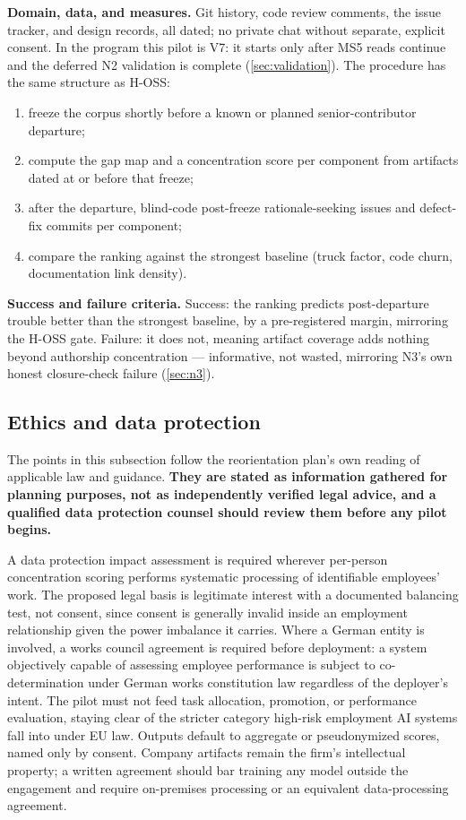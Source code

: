 \textbf{Domain, data, and measures.} Git history, code review comments, the issue tracker, and
design records, all dated; no private chat without separate, explicit consent. In the program this
pilot is V7: it starts only after MS5 reads continue and the deferred N2 validation is complete
(\cref{sec:validation}). The procedure has the same structure as H-OSS:
\begin{enumerate}[noitemsep]
  \item freeze the corpus shortly before a known or planned senior-contributor departure;
  \item compute the gap map and a concentration score per component from artifacts dated at or
    before that freeze;
  \item after the departure, blind-code post-freeze rationale-seeking issues and defect-fix
    commits per component;
  \item compare the ranking against the strongest baseline (truck factor, code churn,
    documentation link density).
\end{enumerate}

\textbf{Success and failure criteria.} Success: the ranking predicts post-departure trouble better
than the strongest baseline, by a pre-registered margin, mirroring the H-OSS gate. Failure: it
does not, meaning artifact coverage adds nothing beyond authorship concentration --- informative,
not wasted, mirroring N3's own honest closure-check failure (\cref{sec:n3}).

\subsection{Ethics and data protection}
\label{sec:org-ethics}

The points in this subsection follow the reorientation plan's own reading of applicable law and
guidance. \textbf{They are stated as information gathered for planning purposes, not as
independently verified legal advice, and a qualified data protection counsel should review them
before any pilot begins.}

A data protection impact assessment is required wherever per-person concentration scoring performs
systematic processing of identifiable employees' work. The proposed legal basis is legitimate
interest with a documented balancing test, not consent, since consent is generally invalid inside an
employment relationship given the power imbalance it carries. Where a German entity is involved, a
works council agreement is required before deployment: a system objectively capable of assessing
employee performance is subject to co-determination under German works constitution law regardless
of the deployer's intent. The pilot must not feed task allocation, promotion, or performance
evaluation, staying clear of the stricter category high-risk employment AI systems fall into under
EU law. Outputs default to aggregate or pseudonymized scores, named only by consent. Company
artifacts remain the firm's intellectual property; a written agreement should bar training any model
outside the engagement and require on-premises processing or an equivalent data-processing
agreement.


